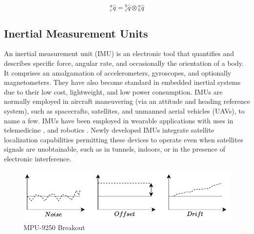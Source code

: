 \begin{equation}
    \textrm{$_{c}^{a}\hat{q}$} = \textrm{$_{c}^{b}\hat{q}$} \otimes \textrm{$_{b}^{a}\hat{q}$}
\end{equation}

\subsection{Inertial Measurement Units}
An inertial measurement unit (IMU) is an electronic tool that quantifies and describes specific force, angular rate, and occasionally the orientation of a body. It comprises an amalgamation of accelerometers, gyroscopes, and optionally magnetometers. They have also become standard in embedded inertial systems due to their low cost, lightweight, and low power consumption. IMUs are normally employed in aircraft maneuvering (via an attitude and heading reference system), such as spacecrafts, satellites, and unmanned aerial vehicles (UAVs), to name a few. IMUs have been employed in wearable applications with uses in  telemedicine \cite{madgwick2020extended}, and robotics \cite{wilson2019formulation}. Newly developed IMUs integrate satellite localization capabilities permitting these devices to operate even when satellites signals are unobtainable, such as in tunnels, indoors, or in the presence of electronic interference.

\begin{figure}[!h]
    \centering
    \includegraphics[width=1\textwidth]{figures/noise.pdf}
    \caption{MPU-9250 Breakout}
    \label{fig:hardware}
\end{figure}


